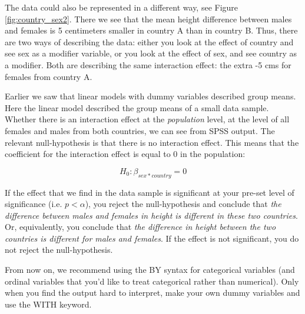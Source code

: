 The data could also be represented in a different way, see Figure \ref{fig:country_sex2}. There we see that the mean height difference between males and females is 5 centimeters smaller in country A than in country B. Thus, there are two ways of describing the data: either you look at the effect of country and see sex as a modifier variable, or you look at the effect of sex, and see country as a modifier. Both are describing the same interaction effect: the extra -5 cms for females from country A.

\begin{knitrout}
\color{fgcolor}\begin{kframe}


{\ttfamily\noindent\bfseries{}}\end{kframe}
\end{knitrout}


Earlier we saw that linear models with dummy variables described group means. Here the linear model described the group means of a small data sample. Whether there is an interaction effect at the \textit{population} level, at the level of all females and males from both countries, we can see from SPSS output. The relevant null-hypothesis is that there is no interaction effect. This means that the coefficient for the interaction effect is equal to 0 in the population:

\begin{equation}
H_0: \beta_{sex*country}=0
\end{equation}

If the effect that we find in the data sample is significant at your pre-set level of significance (i.e. $p < \alpha$), you reject the null-hypothesis and conclude that \textit{the difference between males and females in height is different in these two countries}. Or, equivalently, you conclude that \textit{the difference in height between the two countries is different for males and females}. If the effect is not significant, you do not reject the null-hypothesis.

From now on, we recommend using the BY syntax for categorical variables (and ordinal variables that you'd like to treat categorical rather than numerical). Only when you find the output hard to interpret, make your own dummy variables and use the WITH keyword.





